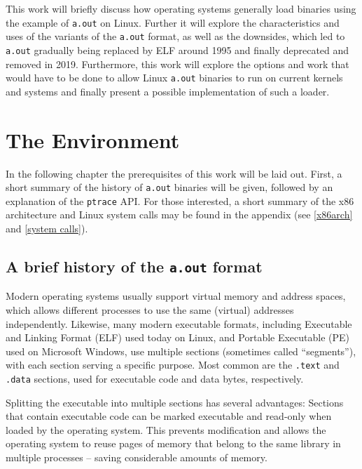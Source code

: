 \documentclass[draft,final]{vutinfth} %
\begin{document}
This work will briefly discuss how operating systems generally load binaries using the example of \texttt{a.out} on Linux. Further it will explore the characteristics and uses of the variants of the \texttt{a.out} format, as well as the downsides, which led to \texttt{a.out} gradually being replaced by ELF around 1995 and finally deprecated and removed in 2019. Furthermore, this work will explore the options and work that would have to be done to allow Linux \texttt{a.out} binaries to run on current kernels and systems and finally present a possible implementation of such a loader.

\chapter{The Environment}
\label{environment}

In the following chapter the prerequisites of this work will be laid out. First, a short summary of the history of \texttt{a.out} binaries will be given, followed by an explanation of the \texttt{ptrace} API. For those interested, a short summary of the x86 architecture and Linux system calls may be found in the appendix (see \ref{x86arch} and \ref{system calls}).

\section{A brief history of the \texttt{a.out} format}
\label{history}

Modern operating systems usually support virtual memory and address spaces, which allows different processes to use the same (virtual) addresses independently. Likewise, many modern executable formats, including Executable and Linking Format (ELF)\cite{ElfManPage} used today on Linux, and Portable Executable (PE) used on Microsoft Windows, use multiple sections (sometimes called ``segments''), with each section serving a specific purpose. Most common are the \texttt{.text} and \texttt{.data} sections, used for executable code and data bytes, respectively.

Splitting the executable into multiple sections has several advantages\cite[page 50]{Levine}: Sections that contain executable code can be marked executable and read-only when loaded by the operating system. This prevents modification and allows the operating system to reuse pages of memory that belong to the same library in multiple processes -- saving considerable amounts of memory.
\end{document}

